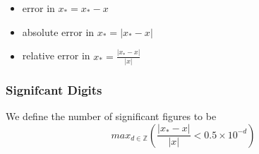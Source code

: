 \documentclass[]{article}
\begin{document}
\begin{itemize}
\item error in $x_*=x_* - x$
\item absolute error in $x_* = |x_*-x|$
\item relative error in $x_* = \frac{|x_*-x|}{|x|}$
\end{itemize}

\subsubsection*{Signifcant Digits}
We define the number of significant figures to be
\[max_{d\in \mathbb Z }\left(\frac{|x_*-x|}{|x|}<0.5\times 10^{-d}\right) \]
\end{document}
